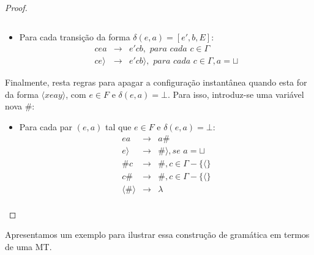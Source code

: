 \documentclass[a4paper]{article}
\theoremstyle{definition}
\begin{document}
\begin{proof}
\begin{itemize}
\[         \]
       \item Para cada transição da forma $\delta(e,a) = [e',b,E]$:
         \[
           \begin{array}{lcl}
             cea & \to & e'cb, \textit{ para cada }c \in \Gamma\\
             ce\rangle & \to & e'cb\rangle, \textit{ para cada } c \in \Gamma, a = \sqcup
           \end{array}
         \]
       \end{itemize}
       Finalmente, resta regras para apagar a configuração instantânea quando
       esta for da forma $\langle x e a y \rangle$, com $e \in F$ e $\delta(e,a)
       = \bot$. Para isso, introduz-se uma variável nova \#:
       \begin{itemize}
          \item Para cada par $(e,a)$ tal que $e\in F$ e $\delta(e,a) = \bot$:
            \[
              \begin{array}{lcl}
                ea & \to & a\# \\
                e\rangle & \to & \#\rangle, \textit{se }a = \sqcup\\
                \#c & \to & \#, c \in \Gamma - \{\langle\}\\
                c\# & \to & \#, c \in \Gamma - \{\langle\}\\
                \langle \# \rangle & \to & \lambda\\
              \end{array}
            \]
       \end{itemize}
  \end{proof}

  Apresentamos um exemplo para ilustrar essa construção de gramática em termos
  de uma MT.
\end{document}
